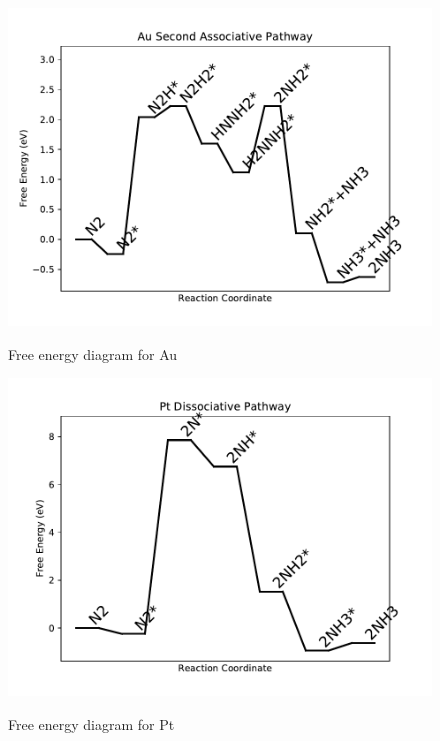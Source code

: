 \documentclass[journal=jacsat,manuscript=article]{achemso}
\begin{document}
\begin{figure}
\includegraphics[width=1\linewidth]{data/plots/Au_associative_2.pdf}
\label{fig:Au_associative_2}
\caption{Free energy diagram for Au}
\end{figure}

\newpage
\begin{figure}
\includegraphics[width=1\linewidth]{data/plots/Pt_dissociative.pdf}
\label{fig:Pt_dissociative}
\caption{Free energy diagram for Pt}
\end{figure}
\end{document}
